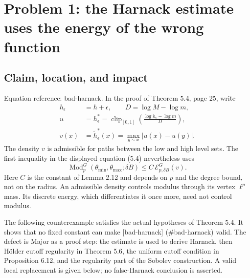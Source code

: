 \documentclass[10pt]{article}
\begin{document}
\section*{Problem 1: the Harnack estimate uses the energy of the wrong function}
\subsection*{Claim, location, and impact}
Equation reference: bad-harnack. In the proof of Theorem 5.4, page 25, write \[\begin{aligned}
 h_\epsilon&=h+\epsilon,\qquad D=\log M-\log m,\\
 u&=h_\epsilon^*=\operatorname{clip}_{[0,1]}\!\left(\frac{\log h_\epsilon-\log m}{D}\right),\\
 v(x)&=\widetilde h_\epsilon^*(x)=\max_{y\sim x}|u(x)-u(y)|.
\end{aligned}\] The density \(v\) is admissible for paths between the low and high level sets. The first inequality in the displayed equation (5.4) nevertheless uses \[
 \operatorname{Mod}_p^G(\theta_{\min},\theta_{\max};\delta B)
 \le C\,\mathcal E^G_{p,\delta B}(v).\] Here \(C\) is the constant of Lemma 2.12 and depends on \(p\) and the degree bound, not on the radius. An admissible density controls modulus through its vertex \(\ell^p\) mass. Its discrete energy, which differentiates it once more, need not control modulus.\par
The following counterexample satisfies the actual hypotheses of Theorem 5.4. It shows that no fixed constant can make [bad-harnack] (\#bad-harnack) valid. The defect is Major as a proof step: the estimate is used to derive Harnack, then Hölder cutoff regularity in Theorem 5.6, the uniform cutoff condition in Proposition 6.12, and the regularity part of the Sobolev construction. A valid local replacement is given below; no false-Harnack conclusion is asserted.\par
\end{document}
